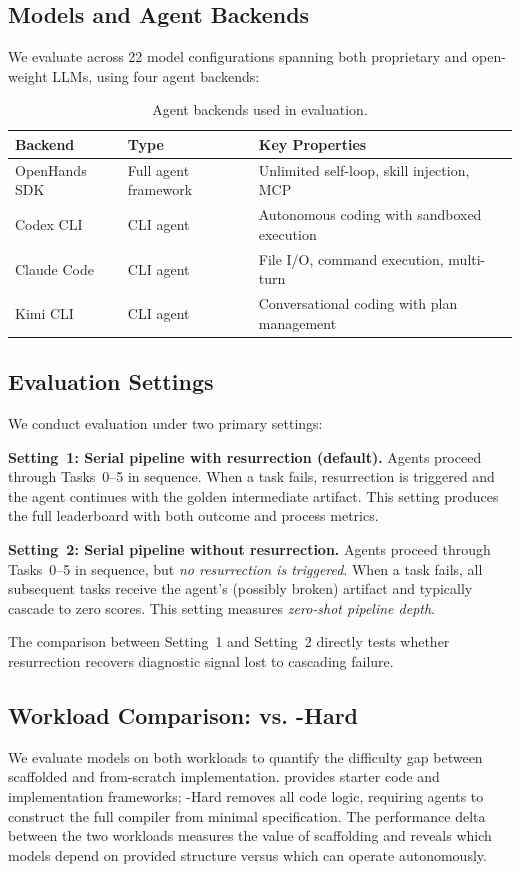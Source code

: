 \subsection{Models and Agent Backends}

We evaluate \evobench{} across 22 model configurations spanning both proprietary and open-weight LLMs, using four agent backends:

\begin{table}[t]
\centering
\small
\begin{tabular}{lll}
\toprule
\textbf{Backend} & \textbf{Type} & \textbf{Key Properties} \\
\midrule
OpenHands SDK & Full agent framework & Unlimited self-loop, skill injection, MCP \\
Codex CLI & CLI agent & Autonomous coding with sandboxed execution \\
Claude Code & CLI agent & File I/O, command execution, multi-turn \\
Kimi CLI & CLI agent & Conversational coding with plan management \\
\bottomrule
\end{tabular}
\caption{Agent backends used in \evobench{} evaluation.}
\label{tab:backends}
\end{table}

\subsection{Evaluation Settings}

We conduct evaluation under two primary settings:

\textbf{Setting~1: Serial pipeline with resurrection (default).}
Agents proceed through Tasks~0--5 in sequence.
When a task fails, resurrection is triggered and the agent continues with the golden intermediate artifact.
This setting produces the full leaderboard with both outcome and process metrics.

\textbf{Setting~2: Serial pipeline without resurrection.}
Agents proceed through Tasks~0--5 in sequence, but \emph{no resurrection is triggered}.
When a task fails, all subsequent tasks receive the agent's (possibly broken) artifact and typically cascade to zero scores.
This setting measures \emph{zero-shot pipeline depth}.

The comparison between Setting~1 and Setting~2 directly tests whether resurrection recovers diagnostic signal lost to cascading failure.

\subsection{Workload Comparison: \yatcc{} vs. \yatcc{}-Hard}

We evaluate models on both workloads to quantify the difficulty gap between scaffolded and from-scratch implementation.
\yatcc{} provides starter code and implementation frameworks; \yatcc{}-Hard removes all code logic, requiring agents to construct the full compiler from minimal specification.
The performance delta between the two workloads measures the value of scaffolding and reveals which models depend on provided structure versus which can operate autonomously.